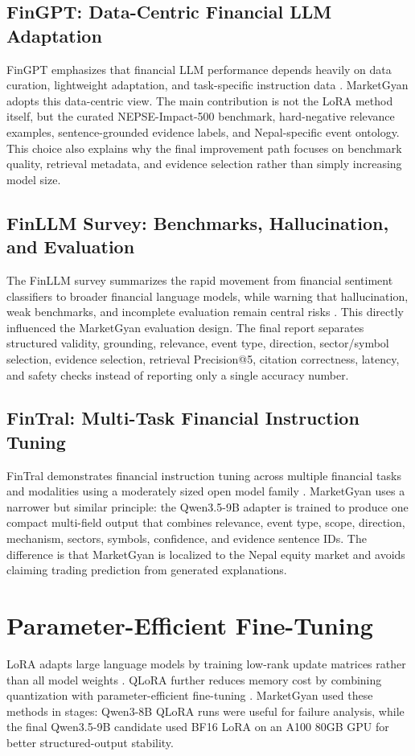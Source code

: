\documentclass[12pt,a4paper]{report}
\begin{document}
\subsection{FinGPT: Data-Centric Financial LLM Adaptation}
FinGPT emphasizes that financial LLM performance depends heavily on data curation, lightweight adaptation, and task-specific instruction data \cite{yang2023fingpt}. MarketGyan adopts this data-centric view. The main contribution is not the LoRA method itself, but the curated NEPSE-Impact-500 benchmark, hard-negative relevance examples, sentence-grounded evidence labels, and Nepal-specific event ontology. This choice also explains why the final improvement path focuses on benchmark quality, retrieval metadata, and evidence selection rather than simply increasing model size.

\subsection{FinLLM Survey: Benchmarks, Hallucination, and Evaluation}
The FinLLM survey summarizes the rapid movement from financial sentiment classifiers to broader financial language models, while warning that hallucination, weak benchmarks, and incomplete evaluation remain central risks \cite{lee2024finllms}. This directly influenced the MarketGyan evaluation design. The final report separates structured validity, grounding, relevance, event type, direction, sector/symbol selection, evidence selection, retrieval Precision@5, citation correctness, latency, and safety checks instead of reporting only a single accuracy number.

\subsection{FinTral: Multi-Task Financial Instruction Tuning}
FinTral demonstrates financial instruction tuning across multiple financial tasks and modalities using a moderately sized open model family \cite{bhatia2024fintral}. MarketGyan uses a narrower but similar principle: the Qwen3.5-9B adapter is trained to produce one compact multi-field output that combines relevance, event type, scope, direction, mechanism, sectors, symbols, confidence, and evidence sentence IDs. The difference is that MarketGyan is localized to the Nepal equity market and avoids claiming trading prediction from generated explanations.

\section{Parameter-Efficient Fine-Tuning}
LoRA adapts large language models by training low-rank update matrices rather than all model weights \cite{hu2021lora}. QLoRA further reduces memory cost by combining quantization with parameter-efficient fine-tuning \cite{dettmers2023qlora}. MarketGyan used these methods in stages: Qwen3-8B QLoRA runs were useful for failure analysis, while the final Qwen3.5-9B candidate used BF16 LoRA on an A100 80GB GPU for better structured-output stability.
\end{document}
